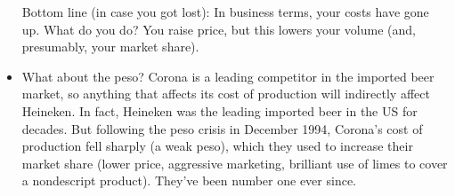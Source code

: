 \documentclass[letterpaper,12pt]{article}
\begin{document}
\begin{itemize}
Bottom line (in case you got lost):  
In business terms, your costs have gone up.  What do you do?  
You raise price, but this lowers your volume 
(and, presumably, your market share).  

\item What about the peso?  
Corona is a leading competitor in the imported beer market, 
so anything that affects its cost of production will 
indirectly affect Heineken. 
In fact, Heineken was the leading imported beer in the US for decades.
But following the peso crisis in December 1994, 
Corona's cost of production fell sharply (a weak peso), 
which they used to increase their market share 
(lower price, aggressive marketing, brilliant use of limes 
to cover a nondescript product).  
They've been number one ever since.  

\end{itemize} 
\end{document}
